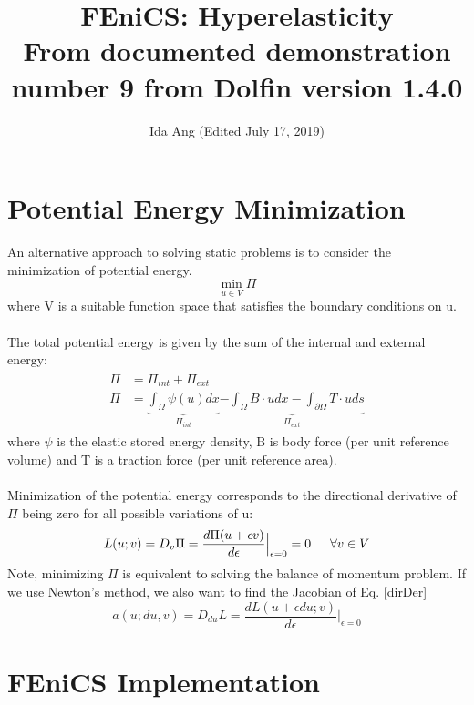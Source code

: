 \documentclass[12pt,3p]{article}
\begin{document}
\title{FEniCS: Hyperelasticity \\
	\large{From documented demonstration number 9 from Dolfin version 1.4.0}}
\author{Ida Ang (Edited July 17, 2019)}
\date{\vspace{-5ex}}
\maketitle

\section{Potential Energy Minimization}
An alternative approach to solving static problems is to consider the minimization of potential energy.
\[ \min_{u \in V} \Pi \]
where V is a suitable function space that satisfies the boundary conditions on u.\\ \\ 
The total potential energy is given by the sum of the internal and external energy: 
\begin{align}\label{PotEnergy}
\begin{split}
\Pi &= \Pi_{int} + \Pi_{ext} \\
\Pi &= \underbrace{\int_{\Omega} \psi(u) dx}_{\Pi_{int}} \underbrace{- \int_{\Omega} B \cdot u dx - \int_{\partial \Omega} T \cdot u ds}_{ \Pi_{ext}}
\end{split}
\end{align}
where $\psi$ is the elastic stored energy density, B is body force (per unit reference volume) and T is a traction force (per unit reference area). \\ \\ 
Minimization of the potential energy corresponds to the directional derivative of $\Pi$ being zero for all possible variations of u: 
\begin{equation} \label{dirDer}
L(u;v) = D_v \Pi = \frac{d \Pi (u + \epsilon v)}{d \epsilon} \Bigr\rvert_{\epsilon = 0} = 0 \indent \forall v \in V
\end{equation}
Note, minimizing $\Pi$ is equivalent to solving the balance of momentum problem.
If we use Newton's method, we also want to find the Jacobian of Eq. \ref{dirDer}
\begin{equation} \label{JacDirDer}
a(u;du,v) = D_{du} L = \frac{dL(u+ \epsilon du; v)}{d \epsilon} \Bigr\rvert_{\epsilon = 0}
\end{equation}


\section{FEniCS Implementation}
\end{document}
